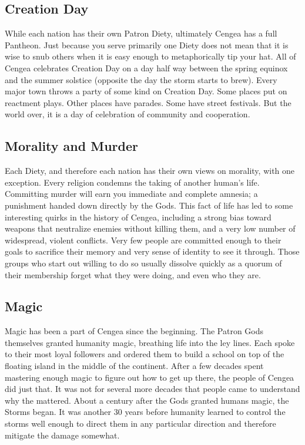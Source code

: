 \documentclass[blue]{GL2020}
\begin{document}

\subsection*{Creation Day}
While each nation has their own Patron Diety, ultimately Cengea has a full Pantheon. Just because you serve primarily one Diety does not mean that it is wise to snub others when it is easy enough to metaphorically tip your hat. All of Cengea celebrates Creation Day on a day half way between the spring equinox and the summer solstice (opposite the day the storm starts to brew). Every major town throws a party of some kind on Creation Day. Some places put on reactment plays. Other places have parades. Some have street festivals. But the world over, it is a day of celebration of community and cooperation.

\subsection*{Morality and Murder}
Each Diety, and therefore each nation has their own views on morality, with one exception. Every religion condemns the taking of another human's life. Committing murder will earn you immediate and complete amnesia; a punishment handed down directly by the Gods. This fact of life has led to some interesting quirks in the history of Cengea, including a strong bias toward weapons that neutralize enemies without killing them, and a very low number of widespread, violent conflicts. Very few people are committed enough to their goals to sacrifice their memory and very sense of identity to see it through. Those groups who start out willing to do so usually dissolve quickly as a quorum of their membership forget what they were doing, and even who they are.

\subsection*{Magic}
Magic has been a part of Cengea since the beginning. The Patron Gods themselves granted humanity magic, breathing life into the ley lines. Each spoke to their most loyal followers and ordered them to build a school on top of the floating island in the middle of the continent. After a few decades spent mastering enough magic to figure out how to get up there, the people of Cengea did just that. It was not for several more decades that people came to understand why the \pSc{} mattered. About a century after the Gods granted humans magic, the Storms began. It was another 30 years before humanity learned to control the storms well enough to direct them in any particular direction and therefore mitigate the damage somewhat.
\end{document}
